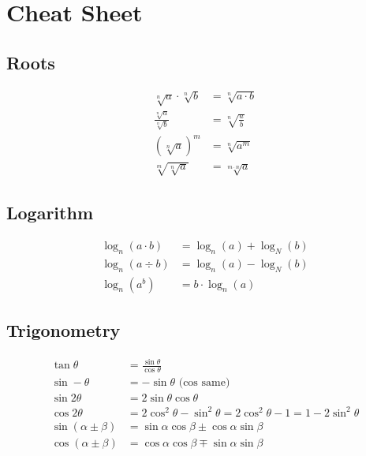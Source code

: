 \section{Cheat Sheet}

\subsection{Roots}

\begin{align*}
    \sqrt[n]{a}\cdot\sqrt[n]{b} & = \sqrt[n]{a\cdot b} \\
    \frac{\sqrt[n]{a}}{\sqrt[n]{b}} & = \sqrt[n]{\frac{a}{b}} \\
    (\sqrt[n]{a})^m & = \sqrt[n]{a^m} \\
    \sqrt[m]{\sqrt[n]{a}} & = \sqrt[m\cdot n]{a}
\end{align*}

\subsection{Logarithm}

\begin{align*}
    \log_n(a\cdot b) & = \log_n(a) + \log_N(b) \\
    \log_n(a\div b) & = \log_n(a) - \log_N(b) \\
    \log_n(a^b) & = b \cdot \log_n(a)
\end{align*}

\subsection{Trigonometry}

\begin{align*}
    \tan\theta & = \frac{\sin\theta}{\cos\theta} \\
    \sin -\theta & = -\sin\theta\text{ (cos same)} \\
    \sin 2\theta & = 2\sin\theta\cos\theta \\
    \cos 2\theta & = 2\cos^2\theta - \sin^2\theta = 2\cos^2\theta - 1 = 1 - 2\sin^2\theta \\
    \sin(\alpha \pm \beta) & = \sin\alpha\cos\beta\pm\cos\alpha\sin\beta \\
    \cos(\alpha\pm\beta) & = \cos\alpha\cos\beta \mp \sin\alpha\sin\beta
\end{align*}

